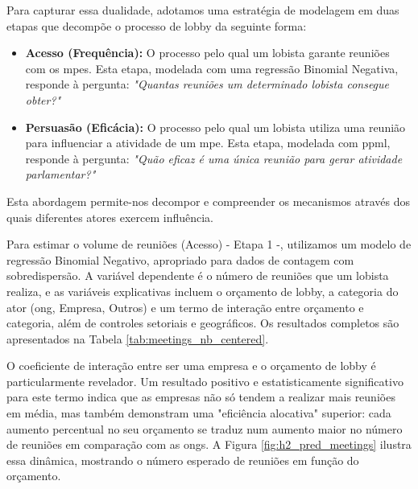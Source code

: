 Para capturar essa dualidade, adotamos uma estratégia de modelagem em duas etapas que decompõe o processo de lobby da seguinte forma:
\begin{itemize}
    \item \textbf{Acesso (Frequência):} O processo pelo qual um lobista garante reuniões com os \acrshort{mpe}s. Esta etapa, modelada com uma regressão Binomial Negativa, responde à pergunta: \textit{"Quantas reuniões um determinado lobista consegue obter?"}
    \item \textbf{Persuasão (Eficácia):} O processo pelo qual um lobista utiliza uma reunião para influenciar a atividade de um \acrshort{mpe}. Esta etapa, modelada com \acrshort{ppml}, responde à pergunta: \textit{"Quão eficaz é uma única reunião para gerar atividade parlamentar?"}
\end{itemize}

Esta abordagem permite-nos decompor e compreender os mecanismos através dos quais diferentes atores exercem influência.

Para estimar o volume de reuniões (Acesso) - Etapa 1 -, utilizamos um modelo de regressão Binomial Negativo, apropriado para dados de contagem com sobredispersão. A variável dependente é o número de reuniões que um lobista realiza, e as variáveis explicativas incluem o orçamento de lobby, a categoria do ator (\acrshort{ong}, Empresa, Outros) e um termo de interação entre orçamento e categoria, além de controles setoriais e geográficos. Os resultados completos são apresentados na Tabela \ref{tab:meetings_nb_centered}.

O coeficiente de interação entre ser uma empresa e o orçamento de lobby é particularmente revelador. Um resultado positivo e estatisticamente significativo para este termo indica que as empresas não só tendem a realizar mais reuniões em média, mas também demonstram uma "eficiência alocativa" superior: cada aumento percentual no seu orçamento se traduz num aumento maior no número de reuniões em comparação com as \acrshort{ong}s. A Figura \ref{fig:h2_pred_meetings} ilustra essa dinâmica, mostrando o número esperado de reuniões em função do orçamento.

